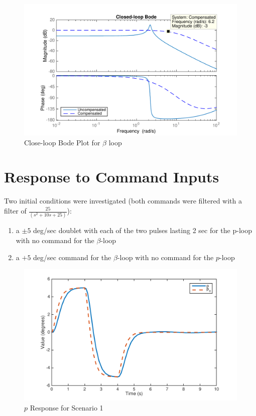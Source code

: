 \documentclass[11pt]{article}
\begin{document}
\begin{figure}[h!]
\begin{center}
\includegraphics[height=.4\textheight]{figures/closeloop_beta}
\caption{Close-loop Bode Plot for $\beta$ loop}
\end{center}
\end{figure}

\clearpage
\section{Response to Command Inputs}
Two initial conditions were investigated (both commands were filtered with a filter of $\frac{25}{(s^2 + 10s + 25)}$):
\begin{enumerate}
\item a $\pm 5$ deg/sec doublet with each of the two pulses lasting 2 sec for the p-loop with no command for the $\beta$-loop
\item a $+ 5$ deg/sec command for the $\beta$-loop with no command for the $p$-loop\\
\end{enumerate}


\begin{figure}[h!]
\begin{center}
\includegraphics[height=.33\textheight]{figures/p2}
\caption{$p$ Response for Scenario 1}
\end{center}
\end{figure}
\end{document}

